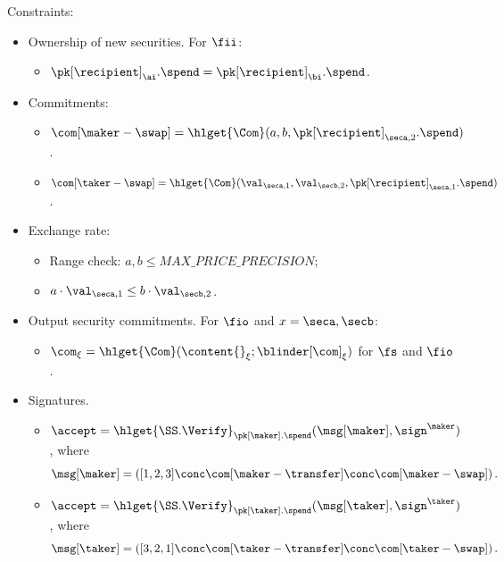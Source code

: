 \noindent Constraints:

\begin{itemize}
	\item Ownership of new securities. For $\fii$:
		\begin{itemize}
			\item $\pk[\recipient]_{\ai}.\spend = \pk[\recipient]_{\bi}.\spend$.
		\end{itemize}
	\item Commitments:
		\begin{itemize}
			\item $\com[\maker-\swap] = \hlget{\Com}(a, b, \pk[\recipient]_{\seca, 2}.\spend)$.
			\item $\com[\taker-\swap] = \hlget{\Com}(\val_{\seca, 1}, \val_{\secb, 2}, \pk[\recipient]_{\seca, 1}.\spend)$.
		\end{itemize}
	\item Exchange rate:
		\begin{itemize}
			\item Range check: $a,b\leq MAX\_PRICE\_PRECISION$;
			\item $a \cdot \val_{\seca, 1} \leq b \cdot \val_{\secb, 2}$.
		\end{itemize}
	\item Output security commitments. For $\fio$ and $x = \seca, \secb$:
		\begin{itemize}
			\item $\com_{\xi} = \hlget{\Com}(\content{}_{\xi}; \blinder[\com]_{\xi})$ for $\fs$ and $\fio$.
		\end{itemize}
	\item Signatures.
		\begin{itemize}
			\item $\accept = \hlget{\SS.\Verify}_{\pk[\maker].\spend} (\msg[\maker], \sign^\maker)$, 
			where 
			\[\msg[\maker] = \left(\sc[1,2,3] \conc \com[\maker-\transfer] \conc \com[\maker-\swap] \right).\]
			\item $\accept = \hlget{\SS.\Verify}_{\pk[\taker].\spend} (\msg[\taker], \sign^\taker)$,
			where 
			\[\msg[\taker] = \left(\sc[3,2,1] \conc \com[\taker-\transfer] \conc \com[\taker-\swap] \right).\]
		\end{itemize}
\end{itemize}